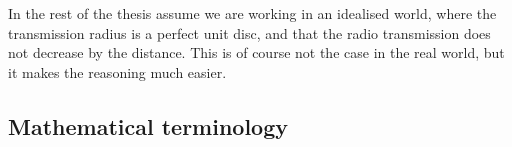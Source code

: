 In the rest of the thesis assume we are working in an idealised world, where the transmission radius is a perfect unit disc, and that the radio transmission does not decrease by the distance. This is of course not the case in the real world, but it makes the reasoning much easier.

\subsection{Mathematical terminology}
